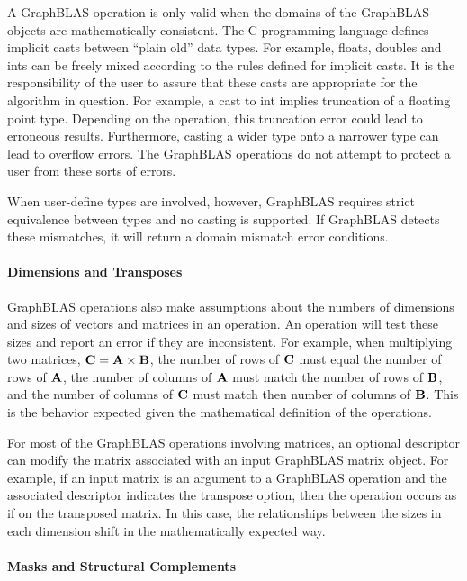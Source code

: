 A GraphBLAS operation is only valid when the domains of the GraphBLAS objects are
mathematically consistent.  The C programming language defines implicit casts 
between ``plain old'' data types.  For example, floats, doubles and ints can be 
freely mixed according to the rules defined for implicit casts.  It is the 
responsibility of the user to assure that these casts are appropriate for the 
algorithm in question.  For example, a cast to int implies truncation of a floating 
point type.  Depending on the operation, this truncation error could lead to
erroneous results.  Furthermore, casting a wider type onto a narrower type can lead 
to overflow errors.  The GraphBLAS operations do not attempt to protect a user from 
these sorts of errors.

When user-define types are involved, however, GraphBLAS requires strict equivalence
between types and no casting is supported.  If GraphBLAS detects these mismatches,
it will return a domain mismatch error conditions.

\paragraph{Dimensions and Transposes}

GraphBLAS operations also make assumptions about the numbers of dimensions and 
sizes of vectors and matrices in an operation.   An operation will test these 
sizes and report an error if they are inconsistent.  For example, when multiplying 
two matrices, ${\bf C} = {\bf A} \times {\bf B}$, the number of rows of 
${\bf C}$ must equal the number of rows of ${\bf A}$, the number of columns 
of ${\bf A}$ must match the number of rows of ${\bf B}$, and the number of 
columns of ${\bf C}$ must match then number of columns of ${\bf B}$.  This 
is the behavior expected given the mathematical definition of the operations.   

For most of the GraphBLAS operations involving matrices, an optional descriptor 
can modify the matrix associated with an input GraphBLAS matrix object.  For 
example, if an input matrix is an argument to a GraphBLAS operation and the 
associated descriptor indicates the transpose option, then the operation occurs 
as if on the transposed matrix.  In this case, the relationships between the 
sizes in each dimension shift in the mathematically expected way. 

\paragraph{Masks and Structural Complements}

